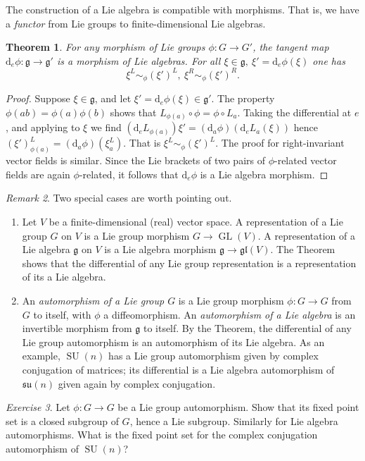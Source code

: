 \documentclass{article}
\newtheorem{theorem}{Theorem}[section]
\theoremstyle{remark}
\newtheorem{exercise}[theorem]{Exercise}
\newtheorem{remark}[theorem]{Remark}
\newcommand\lie[1]{\mathfrak{#1}}
\newcommand{\g}{\lie{g}}
\newcommand{\on}{\operatorname}
\newcommand{\SU}{ \on{SU}}
\newcommand{\GL}{ \on{GL}}
\renewcommand{\d}{{\mbox{d}}}
\newcommand{\mf}{\mathfrak}
\begin{document}
The construction of a Lie algebra is compatible with morphisms.
That is, we have a \emph{functor} from Lie groups to 
finite-dimensional Lie algebras. 
%
\begin{theorem}\label{th:phirelated}
For any morphism of Lie groups $\phi\colon G\to G'$, the tangent map 
$\d_e\phi\colon \g\to \g'$ is a morphism of Lie algebras. For all 
$\xi\in\g,\ \xi'=\d_e\phi(\xi)$ one has
%
\[ \xi^L\sim_\phi (\xi')^L,\ \xi^R\sim_\phi (\xi')^R.\]
%
\end{theorem}
\begin{proof}
Suppose $\xi\in\g$, and let $\xi'=\d_e\phi(\xi)\in\g'$. 
The property $\phi(ab)=\phi(a)\phi(b)$ shows that 
$L_{\phi(a)}\circ \phi=\phi\circ L_a$. Taking the differential 
at $e$, and applying to $\xi$ we find
$(\d_e L_{\phi(a)})\xi'=(\d_a\phi)(\d_e L_a(\xi))$
hence $(\xi')^L_{\phi(a)}= (\d_a\phi)(\xi^L_a)$. That is
$\xi^L\sim_{\phi}(\xi')^L$. The proof for right-invariant 
vector fields is similar. Since the Lie brackets of two pairs of 
$\phi$-related vector fields are again $\phi$-related, it follows that 
$\d_e\phi$ is a Lie algebra morphism. 
\end{proof}
%

\begin{remark}
Two special cases are worth pointing out.  
\begin{enumerate}
\item Let $V$ be a finite-dimensional (real) vector space. 
A representation of a Lie group $G$ on $V$ is a 
Lie group morphism $G\to \GL(V)$. A representation of a 
Lie algebra $\g$ on $V$ is a Lie algebra morphism $\g\to \mf{gl}(V)$. 
The Theorem shows that the differential of any Lie group representation is a 
representation of its a Lie algebra. 
\item
An \emph{automorphism of a Lie group $G$} is a Lie group morphism
$\phi\colon G\to G$ from $G$ to itself, with $\phi$ a
diffeomorphism. An \emph{automorphism of a Lie algebra} is an
invertible morphism from $\g$ to itself.  By the Theorem, the
differential of any Lie group automorphism is an automorphism of its
Lie algebra. As an example, $\SU(n)$ has a Lie group automorphism 
given by complex conjugation of matrices; its differential 
is a Lie algebra automorphism of $\mf{su}(n)$ given again by complex 
conjugation. 
\end{enumerate}
\end{remark}


\begin{exercise}
Let $\phi\colon G\to G$ be a Lie group automorphism. Show that its 
fixed point set is a closed subgroup of $G$, hence a Lie subgroup. 
Similarly for Lie algebra automorphisms. What is the fixed point set 
for the complex conjugation automorphism of $\SU(n)$?
\end{exercise}
\end{document}
